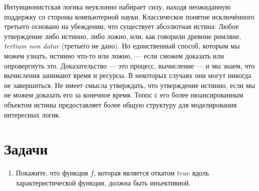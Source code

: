 Интуиционистская логика неуклонно набирает силу, находя
неожиданную поддержку со стороны компьютерной науки. Классическое понятие
исключённого третьего основано на убеждении, что существует абсолютная истина: Любое
утверждение либо истинно, либо ложно, или, как говорили древние римляне,
\emph{tertium non datur} (третьего не дано). Но единственный способ, которым мы
можем узнать, истинно что-то или ложно, — если сможем доказать или
опровергнуть это. Доказательство — это процесс, вычисление --- и мы знаем, что
вычисления занимают время и ресурсы. В некоторых случаях они могут никогда
не завершиться. Не имеет смысла утверждать, что утверждение истинно, если мы
не можем доказать его за конечное время. Топос с его более нюансированным
объектом истины предоставляет более общую структуру для моделирования интересных
логик.

\section{Задачи}

\begin{enumerate}
  \tightlist
  \item
        Покажите, что функция $f$, которая является откатом
        $\mathit{true}$ вдоль характеристической функции, должна быть инъективной.
\end{enumerate}
